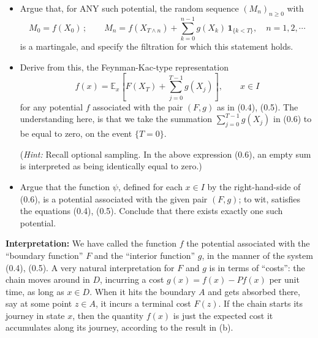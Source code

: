 \begin{itemize}
    \item[(a)] Argue that, for ANY such potential, the random sequence $(M_n)_{n \geq 0}$ with
    \[
        M_0 = f(X_0)\,; \qquad M_n = f(X_{T \wedge n}) + \sum_{k=0}^{n-1} g(X_k)\, \mathbf{1}_{\{k < T\}}, \quad n = 1, 2, \cdots
    \]
    is a martingale, and specify the filtration for which this statement holds.

    \item[(b)] Derive from this, the Feynman-Kac-type representation
    \begin{equation}
        f(x) = \mathbb{E}_x\!\left[F(X_T) + \sum_{j=0}^{T-1} g(X_j)\right], \qquad x \in I
    \end{equation}
    for any potential $f$ associated with the pair $(F, g)$ as in (0.4), (0.5). The understanding here, is that we take the summation $\sum_{j=0}^{T-1} g(X_j)$ in (0.6) to be equal to zero, on the event $\{T = 0\}$.

    (\textit{Hint:} Recall optional sampling. In the above expression (0.6), an empty sum is interpreted as being identically equal to zero.)

    \item[(c)] Argue that the function $\psi$, defined for each $x \in I$ by the right-hand-side of (0.6), is a potential associated with the given pair $(F, g)$; to wit, satisfies the equations (0.4), (0.5). Conclude that there exists exactly one such potential.
\end{itemize}

\textbf{Interpretation:} We have called the function $f$ the potential associated with the ``boundary function'' $F$ and the ``interior function'' $g$, in the manner of the system (0.4), (0.5). A very natural interpretation for $F$ and $g$ is in terms of ``costs'': the chain moves around in $D$, incurring a cost $g(x) = f(x) - Pf(x)$ per unit time, as long as $x \in D$. When it hits the boundary $A$ and gets absorbed there, say at some point $z \in A$, it incurs a terminal cost $F(z)$. If the chain starts its journey in state $x$, then the quantity $f(x)$ is just the expected cost it accumulates along its journey, according to the result in (b).

